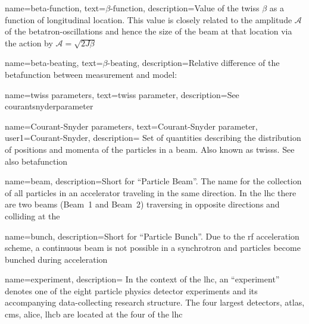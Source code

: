 {
        name={beta-function},
        text=\ensuremath{\beta\text{-function}},
        description={Value of the \gls{twiss} $\beta$ as a function of longitudinal location.
        This value is closely related to the amplitude $\mathcal{A}$ of the betatron-oscillations
        and hence the size of the \gls{beam} at that location via the \gls{action}  
        by $\mathcal{A} = \sqrt{2J\beta}$%
        }
}

{
        name={beta-beating},
        text=\ensuremath{\beta\text{-beating}},
        description={Relative difference of the \gls{betafunction}
        between measurement and model:%
        }
}


{
        name={twiss parameters},
        text={twiss parameter},
        description={See \gls{courantsnyderparameter}}
}

{
        name={Courant-Snyder parameters},
        text={Courant-Snyder parameter},
        user1={Courant-Snyder},
        description={
            Set of quantities describing the distribution of 
            positions and momenta of the particles in a \gls{beam}.
            Also known as \glspl{twiss}. See also \gls{betafunction}
        }
}

{
        name=beam,
        description={Short for ``Particle Beam''. 
        The name for the collection of all particles in an accelerator traveling in the same direction.
        In the \acrfull{lhc} there are two beams (Beam~1 and Beam~2) traversing in opposite directions
        and colliding at the }
}

{
        name=bunch,
        description={Short for ``Particle Bunch''.
        Due to the \acrshort{rf} acceleration scheme, a continuous \gls{beam} is not possible in a
        synchrotron and particles become bunched during acceleration}
}


{
        name=experiment,
        description={
            In the context of the \acrfull{lhc}, an ``experiment'' denotes 
            one of the eight particle physics detector experiments   
            and its accompanying data-collecting research structure.
            The four largest detectors, \acrshort{atlas}, \acrshort{cms}, \acrshort{alice}, \acrshort{lhcb} 
            are located at the four  of the \acrshort{lhc}%
        }
}

